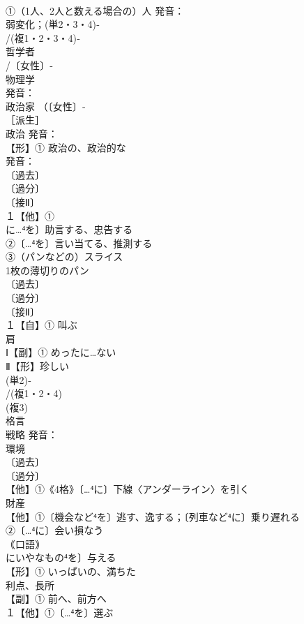 \documentclass[8pt]{extreport}
\begin{document}
\begin{CJK}{UTF8}{min}
\\	①（1人、2人と数える場合の）人 発音：
\\	弱変化；(単2・3・4)‐
\\	/(複1・2・3・4)‐
\\	哲学者 
\\	/〔女性〕‐
\\	物理学 
\\	発音：
\\	政治家 （〔女性〕‐
\\	［派生］ 
\\	政治 発音：
\\	【形】① 政治の、政治的な 
\\	発音：
\\	〔過去〕
\\	〔過分〕
\\	〔接Ⅱ〕
\\	１【他】①
\\	に…⁴を〕助言する、忠告する 
\\	②〔…⁴を〕言い当てる、推測する
\\	③（パンなどの）スライス 
\\	1枚の薄切りのパン
\\	〔過去〕
\\	〔過分〕
\\	〔接Ⅱ〕
\\	１【自】① 叫ぶ 
\\	肩 
\\	Ⅰ【副】① めったに…ない 
\\	Ⅱ【形】珍しい
\\	(単2)‐
\\	/(複1・2・4)
\\	(複3)
\\	格言
\\	戦略 発音：
\\	環境 
\\	〔過去〕
\\	〔過分〕
\\	【他】①《4格》〔…⁴に〕下線〈アンダーライン〉を引く 
\\	財産
\\	【他】①〔機会など⁴を〕逃す、逸する；〔列車など⁴に〕乗り遅れる 
\\	②〔…⁴に〕会い損なう 
\\	｟口語｠
\\	にいやなもの⁴を〕与える
\\	【形】① いっぱいの、満ちた 
\\	利点、長所 
\\	【副】① 前へ、前方へ 
\\	１【他】①〔…⁴を〕選ぶ 

\end{CJK}
\end{document}
